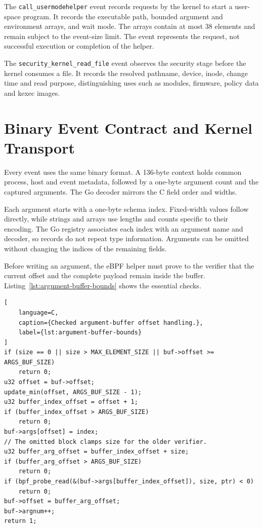 The \texttt{call\_usermodehelper} event records requests by the kernel to start
a user-space program. It records the executable path, bounded argument and
environment arrays, and wait mode. The arrays contain at most 38 elements and
remain subject to the event-size limit. The event represents the request, not
successful execution or completion of the helper.

The \texttt{security\_kernel\_read\_file} event observes the security stage
before the kernel consumes a file. It records the resolved pathname, device,
inode, change time and read purpose, distinguishing uses such as modules,
firmware, policy data and kexec images.

\section{Binary Event Contract and Kernel Transport}
\label{sec:implementation-binary-contract}

Every event uses the same binary format. A 136-byte context holds common
process, host and event metadata, followed by a one-byte argument count and the
captured arguments. The Go decoder mirrors the C field order and widths.

Each argument starts with a one-byte schema index. Fixed-width values follow
directly, while strings and arrays use lengths and counts specific to their
encoding. The Go registry associates each index with an argument name and
decoder, so records do not repeat type information. Arguments can be omitted
without changing the indices of the remaining fields.

Before writing an argument, the eBPF helper must prove to the verifier that the
current offset and the complete payload remain inside the buffer.
Listing~\ref{lst:argument-buffer-bounds} shows the essential checks.

\begin{lstlisting}[
    language=C,
    caption={Checked argument-buffer offset handling.},
    label={lst:argument-buffer-bounds}
]
if (size == 0 || size > MAX_ELEMENT_SIZE || buf->offset >= ARGS_BUF_SIZE)
    return 0;
u32 offset = buf->offset;
update_min(offset, ARGS_BUF_SIZE - 1);
u32 buffer_index_offset = offset + 1;
if (buffer_index_offset > ARGS_BUF_SIZE)
    return 0;
buf->args[offset] = index;
// The omitted block clamps size for the older verifier.
u32 buffer_arg_offset = buffer_index_offset + size;
if (buffer_arg_offset > ARGS_BUF_SIZE)
    return 0;
if (bpf_probe_read(&(buf->args[buffer_index_offset]), size, ptr) < 0)
    return 0;
buf->offset = buffer_arg_offset;
buf->argnum++;
return 1;
\end{lstlisting}

